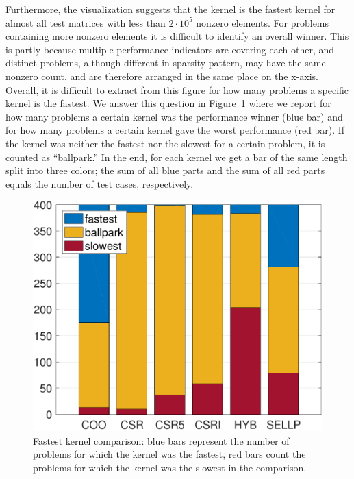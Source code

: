 Furthermore, the visualization suggests that the \coo kernel is the fastest kernel for almost 
all test matrices
with less than $2 \cdot 10^5$ nonzero elements. For problems containing more nonzero elements it
is difficult to identify an overall winner. This is partly because multiple
performance indicators are covering each other, and distinct problems, although different in
sparsity pattern, may have the same nonzero count, and are therefore arranged in the same place on the x-axis. 
Overall, it is difficult to extract from this figure for how many problems a specific kernel is the fastest. 
We answer this question in Figure~\ref{2017-coo-spmv:fig:stats} where we report for how many problems a certain kernel was the performance winner (blue bar) and for how many problems a certain kernel gave the worst performance (red bar). If the kernel was neither the fastest nor the slowest for a certain problem, it is counted as ``ballpark.'' In the end, for each kernel we get a bar of the same length split into three colors; the sum of all blue parts and the sum of all red parts equals the number of test cases, respectively.

\begin{figure}
\begin{center}
\includegraphics[width=\columnwidth]{plots/stats0}
\end{center}
\caption{Fastest kernel comparison: blue bars represent the number of problems
    for which the kernel was the fastest, red bars count the problems for which
    the kernel was the slowest in the comparison.}
\label{2017-coo-spmv:fig:stats}
\end{figure}

